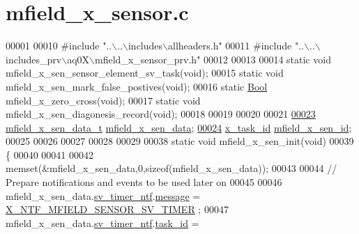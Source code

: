 \hypertarget{a00050_source}{\section{mfield\+\_\+x\+\_\+sensor.\+c}
\label{a00050_source}
}

\begin{DoxyCode}
00001 
00010 \textcolor{preprocessor}{#include "..\(\backslash\)..\(\backslash\)includes\(\backslash\)allheaders.h"}
00011 \textcolor{preprocessor}{#include "..\(\backslash\)..\(\backslash\)includes\_prv\(\backslash\)aq0X\(\backslash\)mfield\_x\_sensor\_prv.h"}
00012 
00013 
00014 \textcolor{keyword}{static} \textcolor{keywordtype}{void}             mfield\_x\_sen\_sensor\_element\_sv\_task(\textcolor{keywordtype}{void});
00015 \textcolor{keyword}{static} \textcolor{keywordtype}{void}             mfield\_x\_sen\_mark\_false\_postives(\textcolor{keywordtype}{void});
00016 \textcolor{keyword}{static} \hyperlink{a00072_a253b248072cfc8bd812c69acd0046eed}{Bool}             mfield\_x\_zero\_cross(\textcolor{keywordtype}{void});
00017 \textcolor{keyword}{static} \textcolor{keywordtype}{void}             mfield\_x\_sen\_diagonesis\_record(\textcolor{keywordtype}{void});
00018 
00019 
00020 
00021 
\hypertarget{a00050_source_l00023}{}\hyperlink{a00050_af8c531b1ba5fea148fb9111e06058f92}{00023} \hyperlink{a00025_d8/de9/a00595}{mfield\_x\_sen\_data\_t} \hyperlink{a00050_af8c531b1ba5fea148fb9111e06058f92}{mfield\_x\_sen\_data};
\hypertarget{a00050_source_l00024}{}\hyperlink{a00050_a19a33e680bf19d1aed76750132ed8b64}{00024} \hyperlink{a00036_ad5c3c5fbfd3e4aadf22830395484a71d}{x\_task\_id}           \hyperlink{a00050_a19a33e680bf19d1aed76750132ed8b64}{mfield\_x\_sen\_id};
00025 
00026 
00027 
00028 
00029 
00038 \textcolor{keyword}{static} \textcolor{keywordtype}{void} mfield\_x\_sen\_init(\textcolor{keywordtype}{void})
00039 \{
00040 
00041 
00042     memset(&mfield\_x\_sen\_data,0,\textcolor{keyword}{sizeof}(mfield\_x\_sen\_data));
00043 
00044     \textcolor{comment}{// Prepare notifications and events to be used later on}
00045 
00046     mfield\_x\_sen\_data.\hyperlink{a00025_ada91b200053f2d93e3639dc4ee3415b4}{sv\_timer\_ntf}.\hyperlink{a00036_adf9665938515a20c283eea2c978cf80d}{message}                               = 
      \hyperlink{a00025_ad9eede821e7c65d58f1806af4bd6bf29}{X\_NTF\_MFIELD\_SENSOR\_SV\_TIMER} ;
00047     mfield\_x\_sen\_data.\hyperlink{a00025_ada91b200053f2d93e3639dc4ee3415b4}{sv\_timer\_ntf}.\hyperlink{a00036_a21b41e494a28583d4da10f1afb1c5328}{task\_id}                        = 

\end{DoxyCode}
